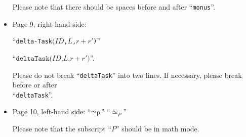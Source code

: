 \documentclass[12pt,onecolumn]{IEEEtranTIE}
\begin{document}
\begin{itemize}
Please note that there should be spaces before and after
``\verb|monus|''.


\newcommand{\mteTask}[2]{\texttt{mteTask(}#1\texttt{,}#2\texttt{)}}
\newcommand{\deltaTask}[3]{\texttt{deltaTask(}#1\texttt{,}#2\texttt{,}#3\texttt{)}}
\newcommand{\mteIS}[1]{\texttt{mteIS(}#1\texttt{)}}
\newcommand{\deltaIS}[2]{\texttt{deltaIS(}#1\texttt{,}#2\texttt{)}}
\newcommand{\IntSrc}[3]{\texttt{<}#1\texttt{:IntSrc|val:}#2\texttt{,cycle:}#3\texttt{>}}
\newcommand{\mteIr}[1]{\texttt{mteIr(}#1\texttt{)}}
\newcommand{\mteS}[1]{\texttt{mte(}#1\texttt{)}}
\newcommand{\deltaS}[2]{\texttt{delta(}#1\texttt{,}#2\texttt{)}}


\item Page 9, right-hand side:

``\verb|delta-Task|$(\mathit{ID}$\verb|,|$L$\verb|,|$r+r'$\verb|)|'' 

\by

``$\deltaTask{\mathit{ID}}{L}{r+r'}$''.

Please do not break ``\verb|deltaTask|'' into two lines. If necessary,
please break before or after \\ ``\verb|deltaTask|''.


\item Page 10, left-hand side: ``$\simeq_{\verb|P|}$'' \by ``$\simeq_P$''

Please note that the subscript ``$P$'' should be in math mode.

\end{itemize}
\end{document}
